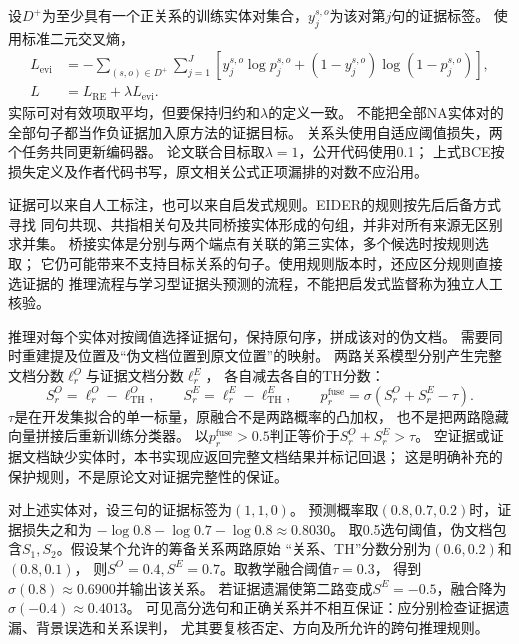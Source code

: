 设$D^+$为至少具有一个正关系的训练实体对集合，$y_j^{s,o}$为该对第$j$句的证据标签。
使用标准二元交叉熵，
\begin{equation}
  \begin{aligned}
    L_{\mathrm{evi}}
      &=-\sum_{(s,o)\in D^+}\sum_{j=1}^{J}
      \left[y_j^{s,o}\log p_j^{s,o}
       +(1-y_j^{s,o})\log(1-p_j^{s,o})\right],\\
    L&=L_{\mathrm{RE}}+\lambda L_{\mathrm{evi}}.
  \end{aligned}
  \label{eq:nlp-extraction-eider-loss}
\end{equation}
实际可对有效项取平均，但要保持归约和$\lambda$的定义一致。
不能把全部NA实体对的全部句子都当作负证据加入原方法的证据目标。
关系头使用自适应阈值损失，两个任务共同更新编码器。
论文联合目标取$\lambda=1$，公开代码使用0.1；
上式BCE按损失定义及作者代码书写，原文相关公式正项漏排的对数不应沿用。

证据可以来自人工标注，也可以来自启发式规则。EIDER的规则按先后后备方式寻找
同句共现、共指相关句及共同桥接实体形成的句组，并非对所有来源无区别求并集。
桥接实体是分别与两个端点有关联的第三实体，多个候选时按规则选取；
它仍可能带来不支持目标关系的句子。使用规则版本时，还应区分规则直接选证据的
推理流程与学习型证据头预测的流程，不能把启发式监督称为独立人工核验。

推理对每个实体对按阈值选择证据句，保持原句序，拼成该对的伪文档。
需要同时重建提及位置及“伪文档位置到原文位置”的映射。
两路关系模型分别产生完整文档分数$\ell_r^O$与证据文档分数$\ell_r^E$，
各自减去各自的TH分数：
\begin{equation}
  S_r^O=\ell_r^O-\ell_{\mathrm{TH}}^O,\qquad
  S_r^E=\ell_r^E-\ell_{\mathrm{TH}}^E,\qquad
  p_r^{\mathrm{fuse}}=\sigma(S_r^O+S_r^E-\tau).
  \label{eq:nlp-extraction-eider-fusion}
\end{equation}
$\tau$是在开发集拟合的单一标量，原融合不是两路概率的凸加权，
也不是把两路隐藏向量拼接后重新训练分类器。
以$p_r^{\mathrm{fuse}}>0.5$判正等价于$S_r^O+S_r^E>\tau$。
空证据或证据文档缺少实体时，本书实现应返回完整文档结果并标记回退；
这是明确补充的保护规则，不是原论文对证据完整性的保证。

对上述实体对，设三句的证据标签为$(1,1,0)$。
预测概率取$(0.8,0.7,0.2)$时，证据损失之和为
$-\log0.8-\log0.7-\log0.8\approx0.8030$。
取0.5选句阈值，伪文档包含$S_1,S_2$。假设某个允许的筹备关系两路原始
“关系、TH”分数分别为$(0.6,0.2)$和$(0.8,0.1)$，
则$S^O=0.4,S^E=0.7$。取教学融合阈值$\tau=0.3$，
得到$\sigma(0.8)\approx0.6900$并输出该关系。
若证据遗漏使第二路变成$S^E=-0.5$，融合降为$\sigma(-0.4)\approx0.4013$。
可见高分选句和正确关系并不相互保证：应分别检查证据遗漏、背景误选和关系误判，
尤其要复核否定、方向及所允许的跨句推理规则。

